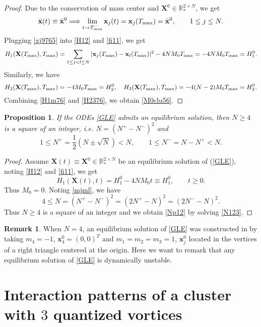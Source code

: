 \documentclass{aims}
\theoremstyle{plain}
\newtheorem{proposition}{Proposition}[section]
\theoremstyle{definition}
\newtheorem{remark}{Remark}[section]
\newcommand{\bx}{{\mathbf x}}
\newcommand{\bX}{{\mathbf X}}
\newcommand{\be} {\begin{equation}}
\newcommand{\ee}{\end{equation}}
\newcommand{\Tmax}{T_{\rm max}}
\begin{document}
\begin{proof}
Due to the conservation of mass center and $\bX^0\in
{\mathbb R}_*^{2\times N}$,
we get
\be\label{xj9765}
\bar{\bx}(t)\equiv \bar\bx^0 \Longrightarrow \lim_{t\to T_{\rm max}^-} \mathbf x_j(t)=\bx_j(\Tmax)=\bar\bx^0, \qquad 1\le j\le N.
\ee
Plugging \eqref{xj9765} into \eqref{H12} and \eqref{fi11}, we get
\be\label{H1m76}
H_1(\bX(T_{\rm max}),T_{\rm max})=\sum_{1\le j<l\le N}|\bx_j(\Tmax)-\bx_l(\Tmax)|^2-4NM_0T_{\rm max}=-4NM_0T_{\rm max}=H_1^0.
\ee
Similarly, we have
\be\label{H2376}
H_2(\bX(T_{\rm max}),T_{\rm max})=-4M_0T_{\rm max}=H_2^0,\quad
H_3(\bX(T_{\rm max}),T_{\rm max})=-4(N-2)M_0T_{\rm max}=H_3^0.
\ee
Combining \eqref{H1m76} and \eqref{H2376}, we obtain \eqref{M0clu56}.
\end{proof}

\begin{proposition}\label{equil}
If the ODEs \eqref{GLE} admits an equilibrium solution, then
$N\ge4 $ is a square of an integer, i.e. $N=(N^+-N^-)^2$ and
\be\label{Np12}
1\le N^+=\frac{1}{2}\left(N\pm \sqrt{N}\right)<N,\qquad
 1\le N^-=N-N^+<N.
 \ee
\end{proposition}

\begin{proof} Assume $\bX(t)\equiv \bX^0\in
{\mathbb R}_*^{2\times N}$ be
an equilibrium solution of (\ref{GLE}), noting \eqref{H12} and \eqref{fi11}, we get
\begin{equation}\label{32}
H_1(\bX(t),t)=H_1^0-4NM_0t \equiv H_1^0, \qquad t\ge0.
\end{equation}
Thus $M_0=0$. Noting \eqref{mjml}, we have
\be\label{N123}
4\le N=(N^{+}-N^{-})^2=(2N^+-N)^2=(2N^--N)^2.
\ee
Thus $N\ge4 $ is a square of an integer and we obtain \eqref{Np12}
by solving \eqref{N123}.
\end{proof}


\begin{remark}
When $N=4$, an equilibrium solution of \eqref{GLE} was constructed
in \cite{Zhang1,Zhang2} by taking $m_4=-1$, $\bx_4^0=(0,0)^T$ and
$m_1=m_2=m_3=1$, $\bx_j^0$ located in the vertices of a right triangle
centered at the origin. Here we want to remark
that any equilibrium solution of \eqref{GLE} is dynamically unstable.
\end{remark}



\section{Interaction patterns of a cluster with $3$ quantized vortices}
\setcounter{equation}{0}
\setcounter{figure}{0}
\end{document}
